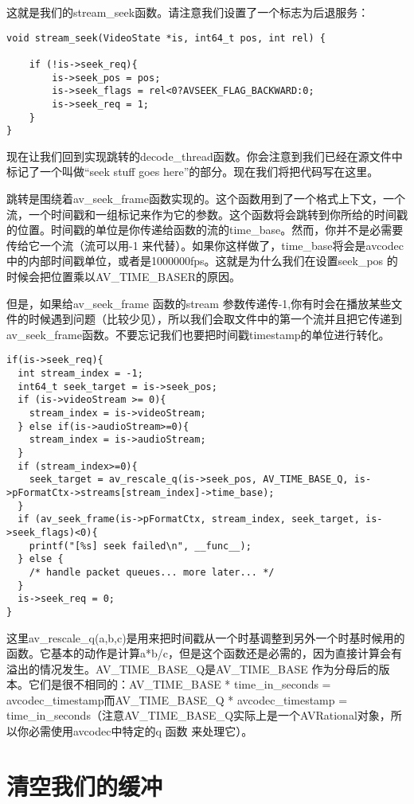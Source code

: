 这就是我们的stream_seek函数。请注意我们设置了一个标志为后退服务：

\begin{lstlisting}
void stream_seek(VideoState *is, int64_t pos, int rel) {

    if (!is->seek_req){
        is->seek_pos = pos;
        is->seek_flags = rel<0?AVSEEK_FLAG_BACKWARD:0;
        is->seek_req = 1;
    }
}
\end{lstlisting}

现在让我们回到实现跳转的decode_thread函数。你会注意到我们已经在源文件中标记了一个叫做“seek stuff goes here”的部分。现在我们将把代码写在这里。

跳转是围绕着av_seek_frame函数实现的。这个函数用到了一个格式上下文，一个流，一个时间戳和一组标记来作为它的参数。这个函数将会跳转到你所给的时间戳的位置。时间戳的单位是你传递给函数的流的time_base。然而，你并不是必需要传给它一个流（流可以用-1 来代替）。如果你这样做了，time_base将会是avcodec中的内部时间戳单位，或者是1000000fps。这就是为什么我们在设置seek_pos 的时候会把位置乘以AV_TIME_BASER的原因。

但是，如果给av_seek_frame 函数的stream 参数传递传-1,你有时会在播放某些文件的时候遇到问题（比较少见），所以我们会取文件中的第一个流并且把它传递到av_seek_frame函数。不要忘记我们也要把时间戳timestamp的单位进行转化。

\begin{lstlisting}
if(is->seek_req){
  int stream_index = -1;
  int64_t seek_target = is->seek_pos;
  if (is->videoStream >= 0){
    stream_index = is->videoStream;
  } else if(is->audioStream>=0){
    stream_index = is->audioStream;
  }
  if (stream_index>=0){
    seek_target = av_rescale_q(is->seek_pos, AV_TIME_BASE_Q, is->pFormatCtx->streams[stream_index]->time_base);
  }
  if (av_seek_frame(is->pFormatCtx, stream_index, seek_target, is->seek_flags)<0){
    printf("[%s] seek failed\n", __func__);
  } else {
    /* handle packet queues... more later... */
  }
  is->seek_req = 0;
}
\end{lstlisting}

这里av_rescale_q(a,b,c)是用来把时间戳从一个时基调整到另外一个时基时候用的函数。它基本的动作是计算a*b/c，但是这个函数还是必需的，因为直接计算会有溢出的情况发生。AV_TIME_BASE_Q是AV_TIME_BASE 作为分母后的版本。它们是很不相同的：AV_TIME_BASE * time_in_seconds = avcodec_timestamp而AV_TIME_BASE_Q * avcodec_timestamp = time_in_seconds（注意AV_TIME_BASE_Q实际上是一个AVRational对象，所以你必需使用avcodec中特定的q 函数 来处理它）。

\section{清空我们的缓冲}

